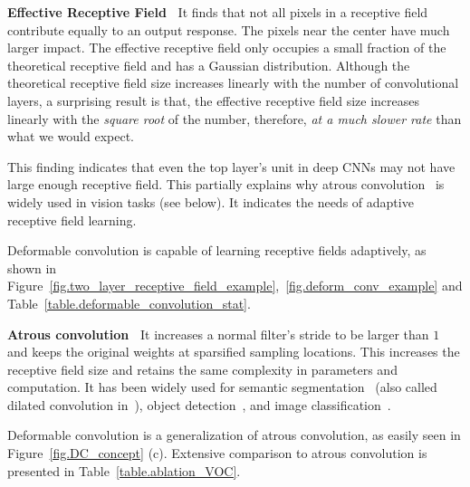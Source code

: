 \documentclass[10pt,twocolumn,letterpaper]{article}
\begin{document}
\textbf{Effective Receptive Field~\cite{luo2017understanding}}  It finds that not all pixels in a receptive field contribute equally to an output response. The pixels near the center have much larger impact. The effective receptive field only occupies a small fraction of the theoretical receptive field and has a Gaussian distribution. Although the theoretical receptive field size increases linearly with the number of convolutional layers, a surprising result is that, the effective receptive field size increases linearly with the \emph{square root} of the number, therefore, \emph{at a much slower rate} than what we would expect.

This finding indicates that even the top layer's unit in deep CNNs may not have large enough receptive field. This partially explains why atrous convolution~\cite{Holschneider89} is widely used in vision tasks (see below). It indicates the needs of adaptive receptive field learning.

Deformable convolution is capable of learning receptive fields adaptively, as shown in Figure~\ref{fig.two_layer_receptive_field_example},~\ref{fig.deform_conv_example} and Table~\ref{table.deformable_convolution_stat}.

\textbf{Atrous convolution~\cite{Holschneider89}} It increases a normal filter's stride to be larger than $1$ and keeps the original weights at sparsified sampling locations. This increases the receptive field size and retains the same complexity in parameters and computation. It has been widely used for semantic segmentation~\cite{long2015fully,chen2016deeplab,fisher2016dilated} (also called dilated convolution in~\cite{fisher2016dilated}), object detection~\cite{dai2016rfcn}, and image classification~\cite{yu2017dilated}.

Deformable convolution is a generalization of atrous convolution, as easily seen in Figure~\ref{fig.DC_concept} (c). Extensive comparison to atrous convolution is presented in Table~\ref{table.ablation_VOC}.
\end{document}
